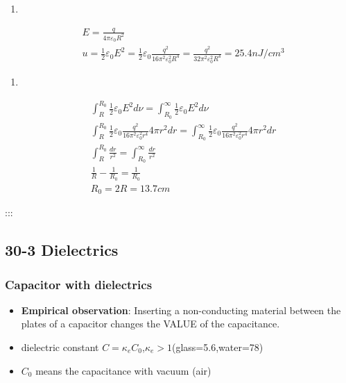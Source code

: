\documentclass[
]{article}
\providecommand{\tightlist}{%
  \setlength{\itemsep}{0pt}\setlength{\parskip}{0pt}}
\begin{document}
\begin{enumerate}
\def\labelenumi{(\alph{enumi})}
\setcounter{enumi}{1}
\tightlist
\item
\end{enumerate}

\[
\begin{aligned}&E=\frac q{4\pi\varepsilon_0R^2}\\&u=\frac12\varepsilon_0E^2=\frac12\varepsilon_0\frac{q^2}{16\pi^2\varepsilon_0^2R^4}=\frac{q^2}{32\pi^2\varepsilon_0^2R^4}=25.4nJ/cm^3\end{aligned}
\]

\begin{enumerate}
\def\labelenumi{(\alph{enumi})}
\setcounter{enumi}{2}
\tightlist
\item
\end{enumerate}

\[
\begin{aligned}
&\int_R^{R_0}\frac12\varepsilon_0E^2d\nu=\int_{R_0}^\infty\frac12\varepsilon_0E^2d\nu \\
&\int_R^{R_0}\frac{1}{2}\varepsilon_0\frac{q^2}{16\pi^2\varepsilon_0^2r^4}4\pi r^2dr=\int_{R_0}^\infty\frac{1}{2}\varepsilon_0\frac{q^2}{16\pi^2\varepsilon_0^2r^4}4\pi r^2dr \\
&\int_R^{R_0}\frac{dr}{r^2}=\int_{R_0}^\infty\frac{dr}{r^2} \\
&\frac1R-\frac1{R_0}=\frac1{R_0} \\
&R_0=2R=13.7cm
\end{aligned}
\]

:::

\hypertarget{dielectrics}{%
\subsection{30-3 Dielectrics}\label{dielectrics}}

\hypertarget{capacitor-with-dielectrics}{%
\subsubsection{Capacitor with
dielectrics}\label{capacitor-with-dielectrics}}

\begin{itemize}
\tightlist
\item
  \textbf{Empirical observation}: Inserting a non-conducting material
  between the plates of a capacitor changes the VALUE of the
  capacitance.
\item
  dielectric constant
  \(C=\kappa _e C_0\),\(\kappa_e>1\)(glass=5.6,water=78)
\item
  \(C_0\) means the capacitance with vacuum (air)
\end{itemize}
\end{document}
